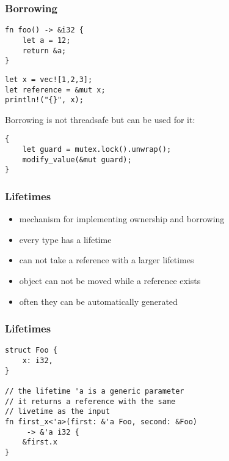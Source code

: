 \documentclass[xcolor=colortbl
]{beamer}
\begin{document}
\begin{frame}
    \frametitle{Borrowing}

\begin{lstlisting}[frame=single]
fn foo() -> &i32 {
    let a = 12;
    return &a;
}
\end{lstlisting}

\begin{lstlisting}[frame=single]
let x = vec![1,2,3];
let reference = &mut x;
println!("{}", x);
\end{lstlisting}

Borrowing is not threadsafe but can be used for it:
\begin{lstlisting}[frame=single]
{
    let guard = mutex.lock().unwrap();
    modify_value(&mut guard);
}
\end{lstlisting}

\end{frame}




\begin{frame}
    \frametitle{Lifetimes}
    
    \begin{itemize}
        \item mechanism for implementing ownership and borrowing
        \item every type has a lifetime
        \item can not take a reference with a larger lifetimes
        \item object can not be moved while a reference exists
        \item often they can be automatically generated
    \end{itemize}
\end{frame}

\begin{frame}[fragile]
    \frametitle{Lifetimes}
\begin{lstlisting}[frame=single]
struct Foo {
    x: i32,
}

// the lifetime 'a is a generic parameter
// it returns a reference with the same 
// livetime as the input
fn first_x<'a>(first: &'a Foo, second: &Foo)
     -> &'a i32 {
    &first.x
}
\end{lstlisting}
\end{frame}
\end{document}
